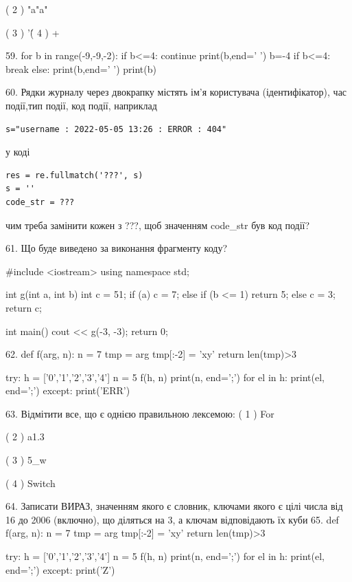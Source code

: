 \documentclass[11pt]{article}
\begin{document}
( 2 ) "a"a"

( 3 ) '\'

( 4 ) +

59. 
for b in range(-9,-9,-2):
    if b<=4:
        continue
        print(b,end=' ')
        b=-4
    if b<=4:
        break
    else:
        print(b,end=' ')
    print(b)

60. 
Рядки журналу через двокрапку містять ім'я користувача (ідентифікатор), час події,тип події, код події, наприклад
\begin{verbatim}
s="username : 2022-05-05 13:26 : ERROR : 404"
\end{verbatim}
у коді 
\begin{verbatim}
res = re.fullmatch('???', s) 
s = ''
code_str = ??? 
\end{verbatim}
чим треба замінити кожен з ???, щоб значенням code\_str був код події? 



61. Що буде виведено за виконання фрагменту коду?

#include <iostream>
using namespace std;

int g(int a, int b){
    int c = 51;
    if (a)
        c = 7;
    else if (b <= 1)
         return 5;
    else 
        c = 3;
    return c;
}

int main(){
    cout << g(-3, -3);
    return 0;
}

62. 
def f(arg, n):
    n = 7
    tmp = arg
    tmp[:-2] = 'xy'
    return len(tmp)>3

try:
    h = ['0','1','2','3','4']
    n = 5
    f(h, n)
    print(n, end=';')
    for el in h:
        print(el, end=';')
except:
    print('ERR')

63. %
Відмітити все, що є однією правильною лексемою:
( 1 ) For

( 2 ) a1.3

( 3 ) 5_w

( 4 ) Switch

64. 
Записати ВИРАЗ, значенням якого є словник, ключами якого є цілі числа від 16 до 2006 (включно), що діляться на 3, а ключам відповідають їх куби 
65. 
def f(arg, n):
    n = 7
    tmp = arg
    tmp[:-2] = 'xy'
    return len(tmp)>3

try:
    h = ['0','1','2','3','4']
    n = 5
    f(h, n)
    print(n, end=';')
    for el in h:
        print(el, end=';')
except:
    print('Z')
\end{document}
